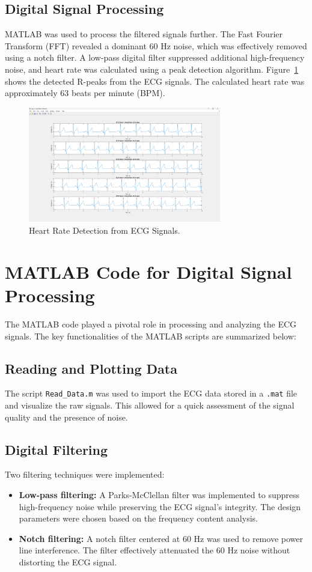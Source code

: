 \documentclass[11pt]{article}
\begin{document}
\subsection{Digital Signal Processing}
MATLAB was used to process the filtered signals further. The Fast Fourier Transform (FFT) revealed a dominant 60 Hz noise,
which was effectively removed using a notch filter. A low-pass digital filter suppressed additional high-frequency noise,
and heart rate was calculated using a peak detection algorithm. Figure~\ref{fig:heartrate} shows the detected R-peaks
from the ECG signals. The calculated heart rate was approximately 63 beats per minute (BPM).
\begin{figure}[H]
  \centering
  \includegraphics[width=0.75\textwidth]{photos/Figure_7_Heart_Rate_Detection.png}
  \caption{Heart Rate Detection from ECG Signals.}
  \label{fig:heartrate}
\end{figure}
\section{MATLAB Code for Digital Signal Processing}
The MATLAB code played a pivotal role in processing and analyzing the ECG signals. The key functionalities of the MATLAB
scripts are summarized below:
\subsection{Reading and Plotting Data}
The script \texttt{Read\_Data.m} was used to import the ECG data stored in a \texttt{.mat} file and visualize the raw signals.
This allowed for a quick assessment of the signal quality and the presence of noise.
\subsection{Digital Filtering}
Two filtering techniques were implemented:
\begin{itemize}
  \item \textbf{Low-pass filtering:} A Parks-McClellan filter was implemented to suppress high-frequency noise while
    preserving the ECG signal's integrity. The design parameters were chosen based on the frequency content analysis.
  \item \textbf{Notch filtering:} A notch filter centered at 60 Hz was used to remove power line interference. The filter
    effectively attenuated the 60 Hz noise without distorting the ECG signal.
\end{itemize}
\end{document}
